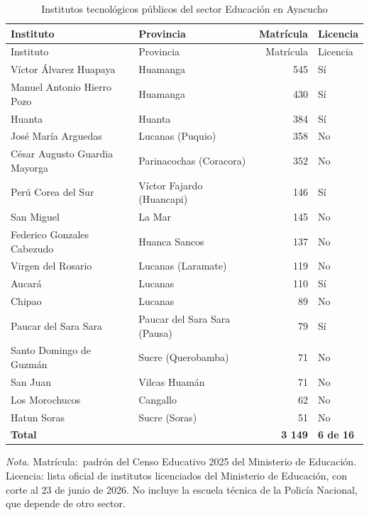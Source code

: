 \documentclass[
  jou,
  floatsintext,
  longtable,
  a4paper,
  nolmodern,
  notxfonts,
  notimes,
  12pt,
  colorlinks=true,linkcolor=blue,citecolor=blue,urlcolor=blue]{apa7}
\newenvironment{twocolumntable}%
{%
\begin{table}[!htbp]%
\onecolumn%
}%
{%
\twocolumn%
\end{table}%
}%
\begin{document}
\begin{twocolumntable}

\begin{longtable}[]{@{}llrl@{}}
\caption{Institutos tecnológicos públicos del sector Educación en
Ayacucho}\label{tbl-ayacucho}\tabularnewline
\toprule\noalign{}
Instituto & Provincia & Matrícula & Licencia \\
\midrule\noalign{}
\endfirsthead
\toprule\noalign{}
Instituto & Provincia & Matrícula & Licencia \\
\midrule\noalign{}
\endhead
\bottomrule\noalign{}
\endlastfoot
Víctor Álvarez Huapaya & Huamanga & 545 & Sí \\
Manuel Antonio Hierro Pozo & Huamanga & 430 & Sí \\
Huanta & Huanta & 384 & Sí \\
José María Arguedas & Lucanas (Puquio) & 358 & No \\
César Augusto Guardia Mayorga & Parinacochas (Coracora) & 352 & No \\
Perú Corea del Sur & Víctor Fajardo (Huancapi) & 146 & Sí \\
San Miguel & La Mar & 145 & No \\
Federico Gonzales Cabezudo & Huanca Sancos & 137 & No \\
Virgen del Rosario & Lucanas (Laramate) & 119 & No \\
Aucará & Lucanas & 110 & Sí \\
Chipao & Lucanas & 89 & No \\
Paucar del Sara Sara & Paucar del Sara Sara (Pausa) & 79 & Sí \\
Santo Domingo de Guzmán & Sucre (Querobamba) & 71 & No \\
San Juan & Vilcas Huamán & 71 & No \\
Los Morochucos & Cangallo & 62 & No \\
Hatun Soras & Sucre (Soras) & 51 & No \\
\textbf{Total} & & \textbf{3 149} & \textbf{6 de 16} \\
\end{longtable}

\noindent \emph{Nota.} Matrícula:~padrón del Censo Educativo 2025 del
Ministerio de Educación. Licencia: lista oficial de institutos
licenciados del Ministerio de Educación, con corte al 23 de junio de
2026. No incluye la escuela técnica de la Policía Nacional, que depende
de otro sector.

\end{twocolumntable}
\end{document}
